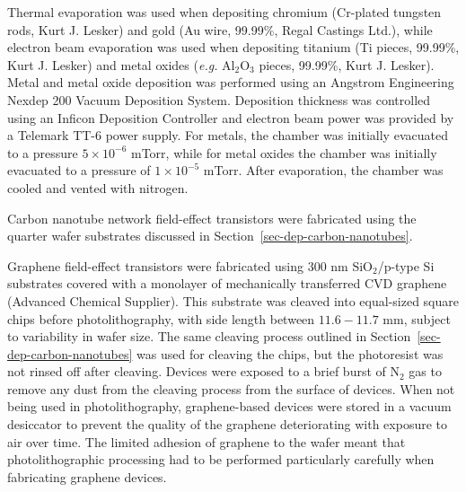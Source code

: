 \documentclass[
  a4paper,
]{scrbook}
\begin{document}
Thermal evaporation was used when depositing chromium (Cr-plated
tungsten rods, Kurt J. Lesker) and gold (Au wire, 99.99\%, Regal
Castings Ltd.), while electron beam evaporation was used when depositing
titanium (Ti pieces, 99.99\%, Kurt J. Lesker) and metal oxides
(\emph{e.g.} Al\(_2\)O\(_3\) pieces, 99.99\%, Kurt J. Lesker). Metal and
metal oxide deposition was performed using an Angstrom Engineering
Nexdep 200 Vacuum Deposition System. Deposition thickness was controlled
using an Inficon Deposition Controller and electron beam power was
provided by a Telemark TT-6 power supply. For metals, the chamber was
initially evacuated to a pressure \(5 \times 10^{-6}\) mTorr, while for
metal oxides the chamber was initially evacuated to a pressure of
\(1 \times 10^{-5}\) mTorr. After evaporation, the chamber was cooled
and vented with nitrogen.

Carbon nanotube network field-effect transistors were fabricated using
the quarter wafer substrates discussed in
Section~\ref{sec-dep-carbon-nanotubes}.

Graphene field-effect transistors were fabricated using 300 nm
SiO\(_2\)/p-type Si substrates covered with a monolayer of mechanically
transferred CVD graphene (Advanced Chemical Supplier). This substrate
was cleaved into equal-sized square chips before photolithography, with
side length between \(11.6-11.7\) mm, subject to variability in wafer
size. The same cleaving process outlined in
Section~\ref{sec-dep-carbon-nanotubes} was used for cleaving the chips,
but the photoresist was not rinsed off after cleaving. Devices were
exposed to a brief burst of N\(_2\) gas to remove any dust from the
cleaving process from the surface of devices. When not being used in
photolithography, graphene-based devices were stored in a vacuum
desiccator to prevent the quality of the graphene deteriorating with
exposure to air over time. The limited adhesion of graphene to the wafer
meant that photolithographic processing had to be performed particularly
carefully when fabricating graphene devices.
\end{document}
